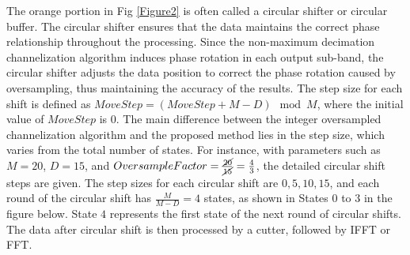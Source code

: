 \documentclass[referee]{raa}
\begin{document}
The orange portion in Fig \ref{Figure2} is often called a circular shifter or circular buffer. The circular shifter ensures that the data maintains the correct phase relationship throughout the processing. Since the non-maximum decimation channelization algorithm induces phase rotation in each output sub-band, the circular shifter adjusts the data position to correct the phase rotation caused by oversampling, thus maintaining the accuracy of the results. The step size for each shift is defined as ${MoveStep} = ({MoveStep} + {M}-{D})\mod M$, where the initial value of ${MoveStep}$ is $0$. The main difference between the integer oversampled channelization algorithm and the proposed method lies in the step size, which varies from the total number of states. For instance, with parameters such as $M = 20$, $D = 15$, and ${OversampleFactor} = \frac{\cancel{20}}{\cancel{15}} = \frac{4}{3}$, the detailed circular shift steps are given. The step sizes for each circular shift are $0, 5, 10, 15$, and each round of the circular shift has $\frac{M}{M-D} = 4$ states, as shown in States $0$ to $3$ in the figure below. State $4$ represents the first state of the next round of circular shifts. The data after circular shift is then processed by a cutter, followed by IFFT or FFT. 
\end{document}
